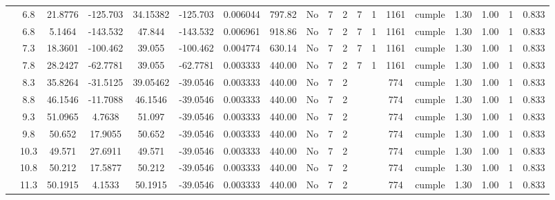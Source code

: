 \begin{table}[H]
{\begin{tabular}{|c|c|c|c|c|c|r|c|c|c|c|c|c|c|c|c|c|c|c|}
\cline{2-19}    & \cellcolor[rgb]{ .851,  .882,  .949}6.8 & 21.8776 & -125.703 & 34.15382 & -125.703 & 0.006044 & 797.82 & No  & 7   & 2   & 7   & 1   & 1161 & \cellcolor[rgb]{ .776,  .937,  .808}cumple & 1.30 & 1.00 & 1   & 0.833 \bigstrut\\
\cline{2-19}    & \cellcolor[rgb]{ .851,  .882,  .949}6.8 & 5.1464 & -143.532 & 47.844 & -143.532 & 0.006961 & 918.86 & No  & 7   & 2   & 7   & 1   & 1161 & \cellcolor[rgb]{ .776,  .937,  .808}cumple & 1.30 & 1.00 & 1   & 0.833 \bigstrut\\
\cline{2-19}    & 7.3 & 18.3601 & -100.462 & 39.055 & -100.462 & 0.004774 & 630.14 & No  & 7   & 2   & 7   & 1   & 1161 & \cellcolor[rgb]{ .776,  .937,  .808}cumple & 1.30 & 1.00 & 1   & 0.833 \bigstrut\\
\cline{2-19}    & 7.8 & 28.2427 & -62.7781 & 39.055 & -62.7781 & 0.003333 & 440.00 & No  & 7   & 2   & 7   & 1   & 1161 & \cellcolor[rgb]{ .776,  .937,  .808}cumple & 1.30 & 1.00 & 1   & 0.833 \bigstrut\\
\cline{2-19}    & 8.3 & 35.8264 & -31.5125 & 39.05462 & -39.0546 & 0.003333 & 440.00 & No  & 7   & 2   &     &     & 774 & \cellcolor[rgb]{ .776,  .937,  .808}cumple & 1.30 & 1.00 & 1   & 0.833 \bigstrut\\
\cline{2-19}    & 8.8 & 46.1546 & -11.7088 & 46.1546 & -39.0546 & 0.003333 & 440.00 & No  & 7   & 2   &     &     & 774 & \cellcolor[rgb]{ .776,  .937,  .808}cumple & 1.30 & 1.00 & 1   & 0.833 \bigstrut\\
\cline{2-19}    & 9.3 & 51.0965 & 4.7638 & 51.097 & -39.0546 & 0.003333 & 440.00 & No  & 7   & 2   &     &     & 774 & \cellcolor[rgb]{ .776,  .937,  .808}cumple & 1.30 & 1.00 & 1   & 0.833 \bigstrut\\
\cline{2-19}    & 9.8 & 50.652 & 17.9055 & 50.652 & -39.0546 & 0.003333 & 440.00 & No  & 7   & 2   &     &     & 774 & \cellcolor[rgb]{ .776,  .937,  .808}cumple & 1.30 & 1.00 & 1   & 0.833 \bigstrut\\
\cline{2-19}    & 10.3 & 49.571 & 27.6911 & 49.571 & -39.0546 & 0.003333 & 440.00 & No  & 7   & 2   &     &     & 774 & \cellcolor[rgb]{ .776,  .937,  .808}cumple & 1.30 & 1.00 & 1   & 0.833 \bigstrut\\
\cline{2-19}    & 10.8 & 50.212 & 17.5877 & 50.212 & -39.0546 & 0.003333 & 440.00 & No  & 7   & 2   &     &     & 774 & \cellcolor[rgb]{ .776,  .937,  .808}cumple & 1.30 & 1.00 & 1   & 0.833 \bigstrut\\
\cline{2-19}    & 11.3 & 50.1915 & 4.1533 & 50.1915 & -39.0546 & 0.003333 & 440.00 & No  & 7   & 2   &     &     & 774 & \cellcolor[rgb]{ .776,  .937,  .808}cumple & 1.30 & 1.00 & 1   & 0.833 \bigstrut\\

\end{tabular}}
\end{table}
